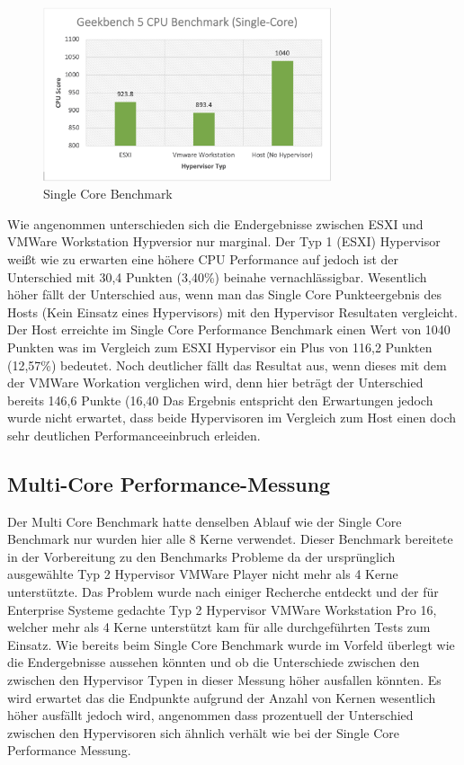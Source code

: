 \documentclass[conference]{IEEEtran}
\begin{document}
\begin{figure}[!h]
	\centering
	\includegraphics[keepaspectratio,width=8.5cm,height=0.75\textheight]{singlecore.png}
	\caption{Single Core Benchmark}
	\label{architecture}
\end{figure}

Wie angenommen unterschieden sich die Endergebnisse zwischen ESXI und VMWare Workstation Hypversior nur marginal. Der Typ 1 (ESXI) Hypervisor weißt wie zu erwarten eine höhere CPU Performance auf jedoch ist der Unterschied mit 30,4 Punkten (3,40\%) beinahe vernachlässigbar. Wesentlich höher fällt der Unterschied aus, wenn man das Single Core Punkteergebnis des Hosts (Kein Einsatz eines Hypervisors) mit den Hypervisor Resultaten vergleicht. Der Host erreichte im Single Core Performance Benchmark einen Wert von 1040 Punkten was im Vergleich zum ESXI Hypervisor ein Plus von 116,2 Punkten (12,57\%) bedeutet. Noch deutlicher fällt das Resultat aus, wenn dieses mit dem der VMWare Workation verglichen wird, denn hier beträgt der Unterschied bereits 146,6 Punkte (16,40%
Das Ergebnis entspricht den Erwartungen jedoch wurde nicht erwartet, dass beide Hypervisoren im Vergleich zum Host einen doch sehr deutlichen Performanceeinbruch erleiden.


\subsection{Multi-Core Performance-Messung}
Der Multi Core Benchmark hatte denselben Ablauf wie der Single Core Benchmark nur wurden hier alle 8 Kerne verwendet. Dieser Benchmark bereitete in der Vorbereitung zu den Benchmarks Probleme da der ursprünglich ausgewählte Typ 2 Hypervisor VMWare Player nicht mehr als 4 Kerne unterstützte. Das Problem wurde nach einiger Recherche entdeckt und der für Enterprise Systeme gedachte Typ 2 Hypervisor VMWare Workstation Pro 16, welcher mehr als 4 Kerne unterstützt kam für alle durchgeführten Tests zum Einsatz.
Wie bereits beim Single Core Benchmark wurde im Vorfeld überlegt wie die Endergebnisse aussehen könnten und ob die Unterschiede zwischen den zwischen den Hypervisor Typen in dieser Messung höher ausfallen könnten. Es wird erwartet das die Endpunkte aufgrund der Anzahl von Kernen wesentlich höher ausfällt jedoch wird, angenommen dass prozentuell der Unterschied zwischen den Hypervisoren sich ähnlich verhält wie bei der Single Core Performance Messung. \newline
\end{document}
